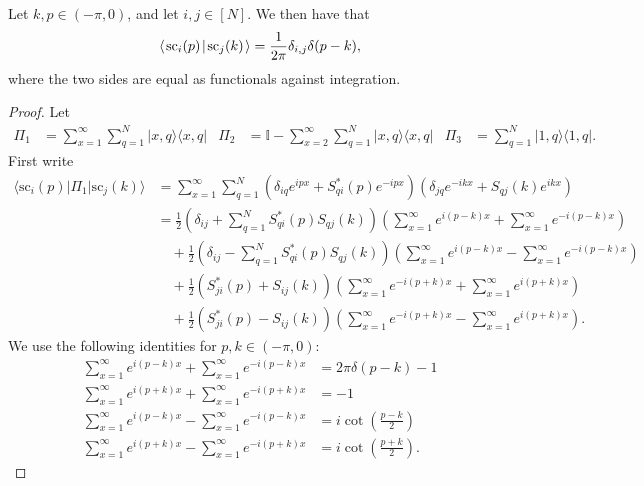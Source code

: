 \documentclass[../thesis-main/thesis-main]{subfiles}
\begin{document}
\begin{lemma}
  Let 	$k,p\in (-\pi,0)$, and let $i,j\in [N]$.  We then have that
  \begin{align}
    \langle\mspace{2mu} \text{sc}_i(p) \mspace{2mu} | \mspace{2mu} \text{sc}_{j}(k)\mspace{2mu} \rangle = \frac{1}{2\pi} \delta_{i,j} \delta(p-k),
    \label{eq:delta}
  \end{align}
  where the two sides are equal as functionals against integration.
\label{lem:orthonormality_of_scattering_states}
\end{lemma}
\begin{proof}
Let 
\begin{align}
\Pi_{1} & = \sum_{x=1}^{\infty}\sum_{q=1}^{N}|x,q\rangle\langle x,q|%
&\Pi_{2} & = \mathbb{I}-\sum_{x=2}^{\infty}\sum_{q=1}^{N}|x,q\rangle\langle x,q|%
&\Pi_{3} & = \sum_{q=1}^{N}|1,q\rangle\langle1,q|.\end{align}
First write 
\begin{align*}
\langle\mathrm{sc}_{i}(p)|\Pi_{1}|\mathrm{sc}_{j}(k)\rangle & = \sum_{x=1}^{\infty}\sum_{q=1}^{N}(\delta_{iq}e^{ipx}+S_{qi}^{\ast}(p)e^{-ipx})(\delta_{jq}e^{-ikx}+S_{qj}(k)e^{ikx})\\
 & = \frac{1}{2}\left(\delta_{ij}+\sum_{q=1}^{N}S_{qi}^{\ast}(p)S_{qj}(k)\right)\left(\sum_{x=1}^{\infty}e^{i(p-k)x}+\sum_{x=1}^{\infty}e^{-i(p-k)x}\right)\\
 & \quad +\frac{1}{2}\left(\delta_{ij}-\sum_{q=1}^{N}S_{qi}^{\ast}(p)S_{qj}(k)\right)\left(\sum_{x=1}^{\infty}e^{i(p-k)x}-\sum_{x=1}^{\infty}e^{-i(p-k)x}\right)\\
 & \quad +\frac{1}{2}(S_{ji}^{\ast}(p)+S_{ij}(k))\left(\sum_{x=1}^{\infty}e^{-i(p+k)x}+\sum_{x=1}^{\infty}e^{i(p+k)x}\right)\\
 & \quad +\frac{1}{2}(S_{ji}^{\ast}(p)-S_{ij}(k))\left(\sum_{x=1}^{\infty}e^{-i(p+k)x}-\sum_{x=1}^{\infty}e^{i(p+k)x}\right).\end{align*}
We use the following identities for $p,k\in(-\pi,0)$: 
\begin{align*}
\sum_{x=1}^{\infty}e^{i(p-k)x}+\sum_{x=1}^{\infty}e^{-i(p-k)x} & = 2\pi\delta(p-k)-1 \\
\sum_{x=1}^{\infty}e^{i(p+k)x}+\sum_{x=1}^{\infty}e^{-i(p+k)x} &=-1 \\
\sum_{x=1}^{\infty}e^{i(p-k)x}-\sum_{x=1}^{\infty}e^{-i(p-k)x} & = i\cot\left(\frac{p-k}{2}\right) \\
\sum_{x=1}^{\infty}e^{i(p+k)x}-\sum_{x=1}^{\infty}e^{-i(p+k)x} &= i\cot\left(\frac{p+k}{2}\right).
\end{align*}

\end{proof}
\end{document}

